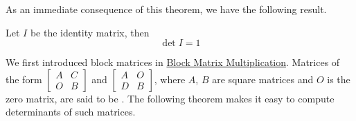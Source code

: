 \documentclass{ximera}
\begin{document}
As an immediate consequence of this theorem, we have the following result.

\begin{corollary}\label{lemma:detofid} Let $I$ be the identity matrix, then
 $$\det{I}=1$$
 \end{corollary}

 We first introduced block matrices in \href{https://ximera.osu.edu/linearalgebradzv3/LinearAlgebraInteractiveIntro/MAT-0023/main}{Block Matrix Multiplication}.  Matrices of the form $\begin{bmatrix}A & C\\O& B\end{bmatrix}$ and $\begin{bmatrix}A & O\\D& B\end{bmatrix}$, where $A$, $B$ are square matrices and $O$ is the zero matrix, are said to be .  The following theorem makes it easy to compute determinants of such matrices.
\end{document}
